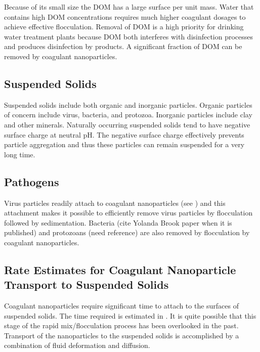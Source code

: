 \documentclass[letterpaper,10pt,english]{sphinxmanual}
\begin{document}
Because of its small size the DOM has a large surface per unit mass. Water that contains high DOM concentrations requires much higher coagulant dosages to achieve effective flocculation. Removal of DOM is a high priority for drinking water treatment plants because DOM both interferes with disinfection processes and produces disinfection by products. A significant fraction of DOM can be removed by coagulant nanoparticles.


\subsection{Suspended Solids}
\label{\detokenize{Rapid_Mix/RM_Intro:suspended-solids}}\label{\detokenize{Rapid_Mix/RM_Intro:heading-suspended-solids-and-coagulant}}
Suspended solids include both organic and inorganic particles. Organic particles of concern include virus, bacteria, and protozoa. Inorganic particles include clay and other minerals. Naturally occurring suspended solids tend to have negative surface charge at neutral pH. The negative surface charge effectively prevents particle aggregation and thus these particles can remain suspended for a very long time.


\subsection{Pathogens}
\label{\detokenize{Rapid_Mix/RM_Intro:pathogens}}\label{\detokenize{Rapid_Mix/RM_Intro:heading-pathogens-and-coagulant}}
Virus particles readily attach to coagulant nanoparticles (see ) and this attachment makes it possible to efficiently remove virus particles by flocculation followed by sedimentation. Bacteria (cite Yolanda Brook paper when it is published) and protozoans (need reference) are also removed by flocculation by coagulant nanoparticles.


\subsection{Rate Estimates for Coagulant Nanoparticle Transport to Suspended Solids}
\label{\detokenize{Rapid_Mix/RM_Intro:rate-estimates-for-coagulant-nanoparticle-transport-to-suspended-solids}}\label{\detokenize{Rapid_Mix/RM_Intro:heading-rate-estimates-for-coagulant-nanoparticle-transport-to-suspended-solids}}
Coagulant nanoparticles require significant time to attach to the surfaces of suspended solids. The time required is estimated in {\hyperref[\detokenize{Rapid_Mix/RM_Theory_and_Future_Work:heading-diffusion-and-shear-transport-coagulant-nanoparticles-to-clay}]{}}. It is quite possible that this stage of the rapid mix/flocculation process has been overlooked in the past. Transport of the nanoparticles to the suspended solids is accomplished by a combination of fluid deformation and diffusion.
\end{document}
